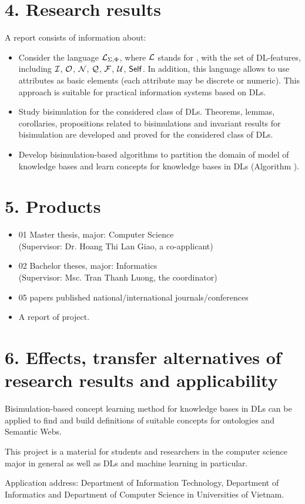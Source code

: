 \section*{4. Research results}
A report consists of information about:
\begin{itemize}
	\item Consider the language $\mathcal{L}_{\Sigma,\Phi}$, where $\mathcal{L}$ stands for \ALCreg, with the set of DL-features, including $\mathcal{I}$, $\mathcal{O}$, $\mathcal{N}$, $\mathcal{Q}$, $\mathcal{F}$, $\mathcal{U}$, $\mathsf{Self}$. In addition, this language allows to use attributes as basic elements (each attribute may be discrete or numeric). This approach is suitable for practical information systems
	based on DLs.
	
	\item Study bisimulation for the considered class of DLs. Theorems, lemmas, corollaries, propositions related to bisimulations and invariant results for bisimulation are developed and proved for the considered class of DLs.
	
	\item Develop bisimulation-based algorithms to partition the domain of model of knowledge bases and learn concepts for knowledge bases in DLs (Algorithm \BBCLearnS).
\end{itemize}
\section*{5. Products}
\begin{itemize}
	\item 01 Master thesis, major: Computer Science\\
	(Supervisor: Dr. Hoang Thi Lan Giao, a co-applicant)
	\item 02 Bachelor theses, major: Informatics\\
	(Supervisor: Msc. Tran Thanh Luong, the coordinator)
	\item 05 papers published national/international journals/conferences
	\item A report of project.
\end{itemize}

\section*{6. Effects, transfer alternatives of research results and applicability}
Bisimulation-based concept learning method for knowledge bases in DLs can be applied to find and build definitions of suitable concepts for ontologies and Semantic Webs.

This project is a material for students and researchers in the computer science major in general as well as DLs and machine learning in particular.

Application address: Department of Information Technology, Department of Informatics and Department of Computer Science in Universities of Vietnam.

\cleardoublepage